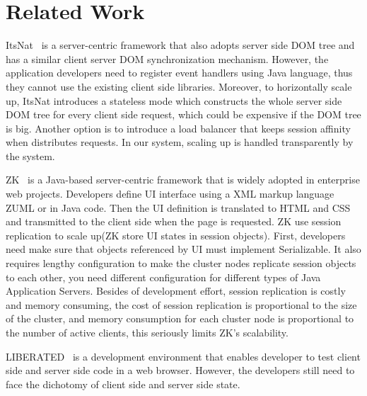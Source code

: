 \section{Related Work}
\label{sec:related}
ItsNat~\cite{santamariaitsnat} is a server-centric framework that also adopts server side DOM tree
and has a similar client server DOM synchronization mechanism.
However, the application developers need to register event handlers using Java
language, thus they cannot use the existing client side \js{} libraries.
Moreover, to horizontally scale up, ItsNat introduces a stateless mode which
constructs the whole server side DOM tree for every client side request,
which could be expensive if the DOM tree is big.
Another option is to introduce a load balancer that 
keeps session affinity when distributes requests.
In our system, scaling up is handled transparently by the system.





ZK~\cite{chen2007zk} is a Java-based server-centric framework that is widely adopted in enterprise web projects.
Developers define UI interface using a XML markup language ZUML or in Java code.
Then the UI definition is translated to HTML and CSS and transmitted to the client side
when the page is requested.
ZK use session replication to scale up(ZK store UI states in session objects).
First, developers need make sure that objects referenced by UI must implement Serializable.
It also requires lengthy configuration to make the cluster nodes 
replicate session objects to each other,
you need different configuration for different types of Java Application Servers.
Besides of development effort, session replication is costly and memory consuming, 
the cost of session replication is proportional to the size of the cluster,
and memory consumption for each cluster node is proportional to the number of active
clients,
this seriously limits ZK's scalability.

LIBERATED~\cite{lipman2011liberated} is a development environment that enables
developer to test client side and server side code in a web browser.
However, the developers still need to face the dichotomy of client side and server side 
state. 


